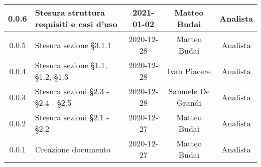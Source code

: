 \begin{center}
\begin{longtable}{|c|p{5cm}|c|c|c|}
		\hline
		0.0.6 & Stesura struttura requisiti e casi d'uso & 2021-01-02 & Matteo Budai & Analista \\
		\hline
		0.0.5 & Stesura sezione §3.1.1 & 2020-12-28 & Matteo Budai & Analista \\
		\hline
		0.0.4 & Stesura sezione §1.1, §1.2, §1.3 & 2020-12-28 & Ivan Piacere & Analista \\
		\hline
		0.0.3 & Stesura sezioni §2.3 - §2.4 - §2.5 & 2020-12-28 & Samuele De Grandi & Analista \\
		\hline
		0.0.2 & Stesura sezioni §2.1 - §2.2 & 2020-12-27 & Matteo Budai & Analista \\
		\hline
		0.0.1 & Creazione documento & 2020-12-27 & Matteo Budai & Analista \\
		\hline
		
	\end{longtable}
\end{center}
